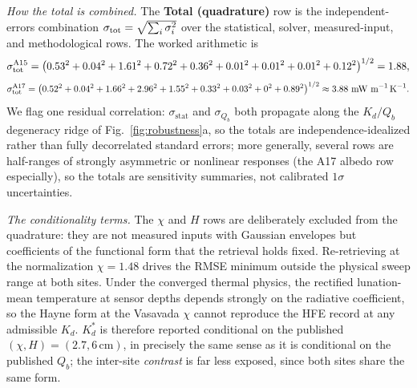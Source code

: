 \documentclass[11pt]{article}
\begin{document}
\emph{How the total is combined.} The \textbf{Total (quadrature)} row is
the independent-errors combination $\sigma_{\rm tot}=\sqrt{\sum_i
\sigma_i^2}$ over the statistical, solver, measured-input, and
methodological rows. The worked arithmetic is
\begin{equation*}
\sigma_{\rm tot}^{\rm A15} =
\big(0.53^{2}+0.04^{2}+1.61^{2}+0.72^{2}+0.36^{2}+0.01^{2}+0.01^{2}+0.01^{2}+0.12^{2}\big)^{1/2}
= 1.88,
\end{equation*}
\begin{equation*}
\sigma_{\rm tot}^{\rm A17} =
\big(0.52^{2}+0.04^{2}+1.66^{2}+2.96^{2}+1.55^{2}+0.33^{2}+0.03^{2}+0^{2}+0.89^{2}\big)^{1/2}
\approx 3.88~\text{mW m}^{-1}\,\text{K}^{-1}.
\end{equation*}
We flag one residual correlation: $\sigma_\mathrm{stat}$ and $\sigma_{Q_b}$
both propagate along the $K_d/Q_b$ degeneracy ridge of
Fig.~\ref{fig:robustness}a, so the totals are independence-idealized
rather than fully decorrelated standard errors; more generally,
several rows are half-ranges of strongly asymmetric or nonlinear
responses (the A17 albedo row especially), so the totals are sensitivity
summaries, not calibrated $1\sigma$ uncertainties.

\emph{The conditionality terms.} The $\chi$ and $H$ rows are deliberately
excluded from the quadrature: they are not measured inputs with Gaussian
envelopes but coefficients of the \citet{hayne2017} functional form that
the retrieval holds fixed. Re-retrieving at the \citet{vasavada2012}
normalization $\chi=1.48$ drives the RMSE minimum outside the physical
sweep range at both sites. Under the converged thermal physics, the
rectified lunation-mean temperature at sensor depths depends strongly on the
radiative coefficient, so the Hayne form at the Vasavada $\chi$ cannot
reproduce the HFE record at any admissible $K_d$. $K_d^{*}$ is therefore
reported conditional on the published $(\chi, H)=(2.7, 6\,\mathrm{cm})$,
in precisely the same sense as it is conditional on the published $Q_b$;
the inter-site \emph{contrast} is far less exposed, since both sites share
the same form.
\end{document}
